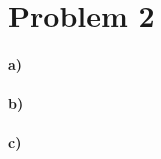 \documentclass[12pt]{article}
\begin{document}
\section*{Problem 2}

\paragraph{a)}

\paragraph{b)}

\paragraph{c)}
\end{document}
